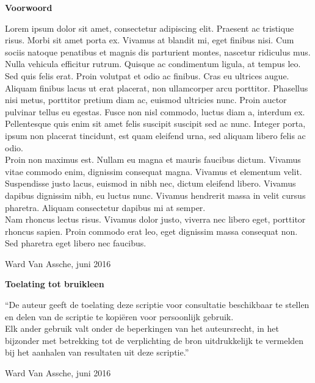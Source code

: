 
\newpage

\noindent \textbf{\huge Voorwoord}

\vspace{1.5cm}

\noindent
Lorem ipsum dolor sit amet, consectetur adipiscing elit. Praesent ac tristique risus. Morbi sit amet porta ex. Vivamus at blandit mi, eget finibus nisi. Cum sociis natoque penatibus et magnis dis parturient montes, nascetur ridiculus mus. Nulla vehicula efficitur rutrum. Quisque ac condimentum ligula, at tempus leo. Sed quis felis erat. Proin volutpat et odio ac finibus. Cras eu ultrices augue. Aliquam finibus lacus ut erat placerat, non ullamcorper arcu porttitor. Phasellus nisi metus, porttitor pretium diam ac, euismod ultricies nunc. Proin auctor pulvinar tellus eu egestas. Fusce non nisl commodo, luctus diam a, interdum ex. Pellentesque quis enim sit amet felis suscipit suscipit sed ac nunc. Integer porta, ipsum non placerat tincidunt, est quam eleifend urna, sed aliquam libero felis ac odio.\\

Proin non maximus est. Nullam eu magna et mauris faucibus dictum. Vivamus vitae commodo enim, dignissim consequat magna. Vivamus et elementum velit. Suspendisse justo lacus, euismod in nibh nec, dictum eleifend libero. Vivamus dapibus dignissim nibh, eu luctus nunc. Vivamus hendrerit massa in velit cursus pharetra. Aliquam consectetur dapibus mi at semper. \\

Nam rhoncus lectus risus. Vivamus dolor justo, viverra nec libero eget, porttitor rhoncus sapien. Proin commodo erat leo, eget dignissim massa consequat non. Sed pharetra eget libero nec faucibus. \\

\addvspace{2.5cm}

\noindent Ward Van Assche, juni 2016\newpage

\noindent \textbf{\huge Toelating tot bruikleen}

\vspace{1.5cm}

\noindent
``De auteur geeft de toelating deze scriptie voor consultatie beschikbaar
te stellen en delen van de scriptie te kopi\"eren voor persoonlijk
gebruik.\\
Elk ander gebruik valt onder de beperkingen van het auteursrecht,
in het bijzonder met betrekking tot de verplichting de bron uitdrukkelijk
te vermelden bij het aanhalen van resultaten uit deze scriptie.''

\addvspace{4cm}

\noindent Ward Van Assche, juni 2016

